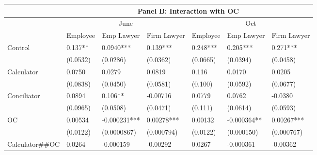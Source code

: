 \begin{tabular}{lrrrrrr}
\toprule
      & \multicolumn{6}{c}{Panel B: Interaction with OC} \\
\midrule
      & \multicolumn{3}{c}{June} & \multicolumn{3}{c}{Oct} \\
      & \multicolumn{1}{c}{Employee } & \multicolumn{1}{c}{Emp Lawyer } & \multicolumn{1}{c}{Firm Lawyer } & \multicolumn{1}{c}{Employee } & \multicolumn{1}{c}{Emp Lawyer } & \multicolumn{1}{c}{Firm Lawyer } \\
      \midrule
Control & \multicolumn{1}{l}{0.137**} & \multicolumn{1}{l}{0.0940***} & \multicolumn{1}{l}{0.139***} & \multicolumn{1}{l}{0.248***} & \multicolumn{1}{l}{0.205***} & \multicolumn{1}{l}{0.271***} \\
      & \multicolumn{1}{l}{(0.0532)} & \multicolumn{1}{l}{(0.0286)} & \multicolumn{1}{l}{(0.0362)} & \multicolumn{1}{l}{(0.0665)} & \multicolumn{1}{l}{(0.0394)} & \multicolumn{1}{l}{(0.0458)} \\
Calculator & \multicolumn{1}{l}{0.0750} & \multicolumn{1}{l}{0.0279} & \multicolumn{1}{l}{0.0819} & \multicolumn{1}{l}{0.116} & \multicolumn{1}{l}{0.0170} & \multicolumn{1}{l}{0.0205} \\
      & \multicolumn{1}{l}{(0.0838)} & \multicolumn{1}{l}{(0.0450)} & \multicolumn{1}{l}{(0.0581)} & \multicolumn{1}{l}{(0.100)} & \multicolumn{1}{l}{(0.0592)} & \multicolumn{1}{l}{(0.0677)} \\
Conciliator & \multicolumn{1}{l}{0.0894} & \multicolumn{1}{l}{0.106**} & \multicolumn{1}{l}{-0.00716} & \multicolumn{1}{l}{0.0779} & \multicolumn{1}{l}{0.0762} & \multicolumn{1}{l}{-0.0380} \\
      & \multicolumn{1}{l}{(0.0965)} & \multicolumn{1}{l}{(0.0508)} & \multicolumn{1}{l}{(0.0471)} & \multicolumn{1}{l}{(0.111)} & \multicolumn{1}{l}{(0.0614)} & \multicolumn{1}{l}{(0.0593)} \\
OC    & \multicolumn{1}{l}{0.00534} & \multicolumn{1}{l}{-0.000231***} & \multicolumn{1}{l}{0.00278***} & \multicolumn{1}{l}{0.00132} & \multicolumn{1}{l}{-0.000364**} & \multicolumn{1}{l}{0.00267***} \\
      & \multicolumn{1}{l}{(0.0122)} & \multicolumn{1}{l}{(0.0000867)} & \multicolumn{1}{l}{(0.000794)} & \multicolumn{1}{l}{(0.0122)} & \multicolumn{1}{l}{(0.000150)} & \multicolumn{1}{l}{(0.000767)} \\
Calculator\#\#OC & \multicolumn{1}{l}{0.0264} & \multicolumn{1}{l}{-0.000159} & \multicolumn{1}{l}{-0.00292} & \multicolumn{1}{l}{0.0267} & \multicolumn{1}{l}{-0.000361} & \multicolumn{1}{l}{-0.00362} \\

\end{tabular}
